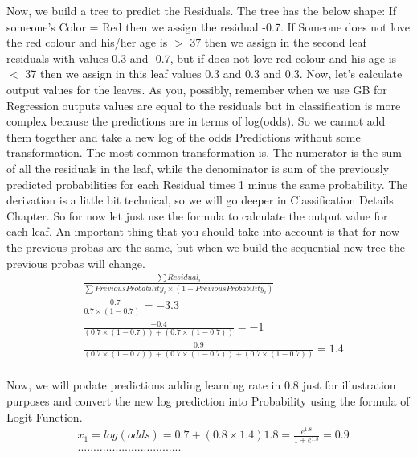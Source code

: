 \documentclass[12pt, a4paper]{article} %
\begin{document}
Now, we build a tree to predict the Residuals. The tree has the below shape:
If someone's Color = Red then we assign the residual -0.7. If Someone does not love the red colour and his/her age is $>$ 37 then we assign in the second leaf residuals with values 0.3 and -0.7, but  if does not love red colour and his age is $<$ 37 then we assign in this leaf values 0.3 and 0.3 and 0.3. Now, let's calculate output values for the leaves. As you, possibly, remember when we use GB for Regression outputs values are equal to the residuals but in classification is more complex because the predictions are in terms of log(odds). So we cannot add them together and take a new log of the odds Predictions without some transformation. The most common transformation is. The numerator is the sum of all the residuals in the leaf, while the denominator is sum of the previously predicted probabilities for each Residual times 1 minus the same probability. The derivation is a little bit technical, so we will go deeper in Classification Details Chapter. So for now let just use the formula to calculate the output value for each leaf. An important thing that you should take into account is that for now the previous probas are the same, but when we build the sequential new tree the previous probas will change.
\begin{align*}
    & \frac{\sum Residual_{i}}{\sum Previous Probability_{i} \times (1 - Previous Probability_{i})}\\
    & \frac{ - 0.7}{0.7 \times (1 - 0.7)} = -3.3\\
    & \frac{- 0.4}{(0.7 \times (1 - 0.7)) + (0.7 \times (1 - 0.7))} = - 1\\
    & \frac{0.9}{(0.7 \times (1 - 0.7)) + (0.7 \times (1 - 0.7)) + (0.7 \times (1 - 0.7))} = 1.4\\
\end{align*}

Now, we will podate predictions adding learning rate in 0.8 just for illustration purposes and convert the new log prediction into Probability using the formula of Logit Function.
\begin{align*}
    & x_{1} = log(odds) = 0.7 + (0.8 \times 1.4) 1.8= \frac{e^1.8}{1 + e^1.8} = 0.9\\
    &.................................\\
\end{align*}
\end{document}
